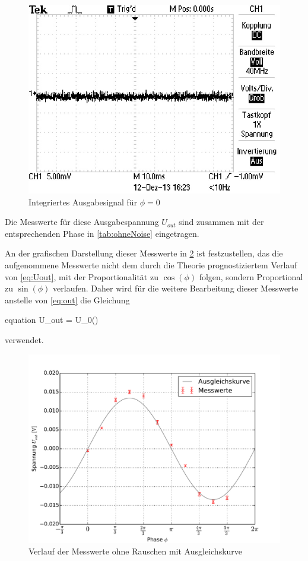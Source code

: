 	
		\begin{figure}[!h]
			\centering
			\includegraphics[scale=0.4]{Grafiken/IntegrierteSpannung.jpg}
			\caption{Integriertes Ausgabesignal für $\phi = 0$}
			\label{fig:Uout}
		\end{figure} 
	
	Die Messwerte für diese Ausgabespannung $U_{out}$ sind zusammen mit der entsprechenden Phase in \cref{tab:ohneNoise} eingetragen. 

	
	
	An der grafischen Darstellung dieser Messwerte in \cref{fig:ohneNoise} ist festzustellen, das die aufgenommene Messwerte nicht dem
	durch die Theorie prognostiziertem Verlauf von \cref{eq:Uout}, mit der Proportionalität zu $\cos(\phi)$ folgen, sondern Proportional 
	zu $\sin(\phi)$ verlaufen. Daher wird für die weitere Bearbeitung dieser Messwerte anstelle von \cref{eq:out} die Gleichung 
	\begin{empheq}{equation}
			U_{out} = U_{0}\sin(\phi)
			\label{eq:Uout_sin}
	\end{empheq}     
	verwendet.   
	
		\begin{figure}[!h]
			\centering
			\includegraphics[scale=0.75]{Grafiken/OhneNoise.pdf}
			\caption{Verlauf der Messwerte ohne Rauschen mit Ausgleichskurve}
			\label{fig:ohneNoise}
		\end{figure} 
	
